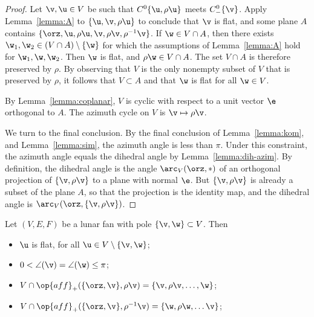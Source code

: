 \begin{proof} Let $\v, \u\in V$ be such that $C^0\{\u,\rho \u\}$ meets
$C^0_-\{\v\}$.  Apply Lemma~\ref{lemma:A} to $\{\u,\v,\rho \u\}$ to
conclude that $\v$ is flat, and some plane $A$ contains
$\{\orz,\u,\rho\u,\v,\rho \v,\rho^{-1} \v\}$.  If
$\w\in V\cap A$, then there exists $\w_1,\w_2\in (V\cap
A)\setminus\{\w\}$ for which the assumptions of Lemma~\ref{lemma:A}
hold for $\w_1,\w,\w_2$.  
Then $\w$ is flat, and $\rho \w \in V\cap A$.  The set $V\cap
A$ is therefore preserved by $\rho$.  By observing that $V$ is the
only nonempty subset of $V$ that is preserved by $\rho$, it follows
that $V\subset A$ and that $\w$ is flat for all $\w\in V$.


By Lemma~\ref{lemma:coplanar}, $V$ is cyclic with respect to a unit
vector $\e$ orthogonal to $A$.  The azimuth cycle on $V$ is $\v
\mapsto \rho \v$.

We turn to the final conclusion.  By the final conclusion of
Lemma~\ref{lemma:kom}, and Lemma~\ref{lemma:sim}, the azimuth angle is
less than $\pi$.  Under this constraint, the azimuth angle equals the
dihedral angle by Lemma~\ref{lemma:dih-azim}.  By definition, the
dihedral angle is the angle $\arc_V(\orz,*)$ of an orthogonal
projection of $\{\v,\rho\v\}$ to a plane with normal $\e$.  But
$\{\v,\rho\v\}$ is already a subset of the plane $A$, so that the
projection is the identity map, and the dihedral angle is
$\arc_V(\orz,\{\v,\rho\v\})$.
%
\end{proof}

\begin{lemma}\label{lemma:lunar}
Let $(V,E,F)$ be a lunar fan with pole $\{\v,\w\}\subset V$.  
Then
\begin{itemize}
\item $\u$ is flat, for all $\u\in V\setminus \{\v,\w\}$; \vspace{3pt}
\item $0< \angle(\v) = \angle(\w)\le \pi$; \vspace{3pt}
\item $V\cap \op{aff}_+(\{\orz,\v\},\rho \v) = \{\v,\rho \v,\ldots,
\w\}$; \vspace{3pt}
\item $V \cap \op{aff}_+(\{\orz,\v\},\rho^{-1} \v) = \{\w,\rho
\w,\ldots \v\}$; \vspace{3pt}
\end{itemize}
\end{lemma}

